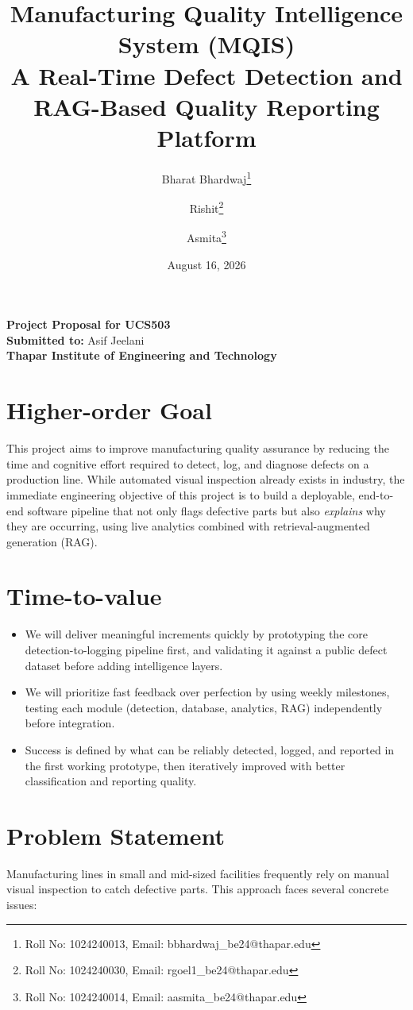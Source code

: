 \documentclass[11pt]{article}
\title{\textbf{Manufacturing Quality Intelligence System (MQIS)\\
A Real-Time Defect Detection and RAG-Based Quality Reporting Platform}}
\author{
Bharat Bhardwaj\thanks{Roll No: 1024240013, Email: bbhardwaj\_be24@thapar.edu } \and
Rishit\thanks{Roll No: 1024240030, Email: rgoel1\_be24@thapar.edu} \and
Asmita\thanks{Roll No: 1024240014, Email: aasmita\_be24@thapar.edu}
}
\date{August 16, 2026}
\begin{document}
\maketitle

\noindent\textbf{Project Proposal for UCS503}\\
\textbf{Submitted to:} Asif Jeelani\\
\textbf{Thapar Institute of Engineering and Technology}

\vspace{0.3cm}

\section{Higher-order Goal}
This project aims to improve manufacturing quality assurance by reducing the time and
cognitive effort required to detect, log, and diagnose defects on a production line. While
automated visual inspection already exists in industry, the immediate engineering objective
of this project is to build a deployable, end-to-end software pipeline that not only flags
defective parts but also \emph{explains} why they are occurring, using live analytics
combined with retrieval-augmented generation (RAG).

\section{Time-to-value}
\begin{itemize}[leftmargin=*]
    \item We will deliver meaningful increments quickly by prototyping the core detection-to-logging
    pipeline first, and validating it against a public defect dataset before adding intelligence layers.
    \item We will prioritize fast feedback over perfection by using weekly milestones, testing each
    module (detection, database, analytics, RAG) independently before integration.
    \item Success is defined by what can be reliably detected, logged, and reported in the first
    working prototype, then iteratively improved with better classification and reporting quality.
\end{itemize}

\section{Problem Statement}
Manufacturing lines in small and mid-sized facilities frequently rely on manual visual inspection
to catch defective parts. This approach faces several concrete issues:
\end{document}
